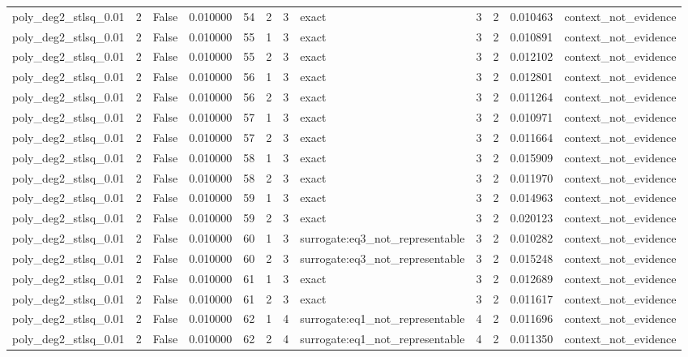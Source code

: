\begin{tabular}{lrrrrrrlrrrl}
poly\_deg2\_stlsq\_0.01 & 2 & False & 0.010000 & 54 & 2 & 3 & exact & 3 & 2 & 0.010463 & context\_not\_evidence \\
poly\_deg2\_stlsq\_0.01 & 2 & False & 0.010000 & 55 & 1 & 3 & exact & 3 & 2 & 0.010891 & context\_not\_evidence \\
poly\_deg2\_stlsq\_0.01 & 2 & False & 0.010000 & 55 & 2 & 3 & exact & 3 & 2 & 0.012102 & context\_not\_evidence \\
poly\_deg2\_stlsq\_0.01 & 2 & False & 0.010000 & 56 & 1 & 3 & exact & 3 & 2 & 0.012801 & context\_not\_evidence \\
poly\_deg2\_stlsq\_0.01 & 2 & False & 0.010000 & 56 & 2 & 3 & exact & 3 & 2 & 0.011264 & context\_not\_evidence \\
poly\_deg2\_stlsq\_0.01 & 2 & False & 0.010000 & 57 & 1 & 3 & exact & 3 & 2 & 0.010971 & context\_not\_evidence \\
poly\_deg2\_stlsq\_0.01 & 2 & False & 0.010000 & 57 & 2 & 3 & exact & 3 & 2 & 0.011664 & context\_not\_evidence \\
poly\_deg2\_stlsq\_0.01 & 2 & False & 0.010000 & 58 & 1 & 3 & exact & 3 & 2 & 0.015909 & context\_not\_evidence \\
poly\_deg2\_stlsq\_0.01 & 2 & False & 0.010000 & 58 & 2 & 3 & exact & 3 & 2 & 0.011970 & context\_not\_evidence \\
poly\_deg2\_stlsq\_0.01 & 2 & False & 0.010000 & 59 & 1 & 3 & exact & 3 & 2 & 0.014963 & context\_not\_evidence \\
poly\_deg2\_stlsq\_0.01 & 2 & False & 0.010000 & 59 & 2 & 3 & exact & 3 & 2 & 0.020123 & context\_not\_evidence \\
poly\_deg2\_stlsq\_0.01 & 2 & False & 0.010000 & 60 & 1 & 3 & surrogate:eq3\_not\_representable & 3 & 2 & 0.010282 & context\_not\_evidence \\
poly\_deg2\_stlsq\_0.01 & 2 & False & 0.010000 & 60 & 2 & 3 & surrogate:eq3\_not\_representable & 3 & 2 & 0.015248 & context\_not\_evidence \\
poly\_deg2\_stlsq\_0.01 & 2 & False & 0.010000 & 61 & 1 & 3 & exact & 3 & 2 & 0.012689 & context\_not\_evidence \\
poly\_deg2\_stlsq\_0.01 & 2 & False & 0.010000 & 61 & 2 & 3 & exact & 3 & 2 & 0.011617 & context\_not\_evidence \\
poly\_deg2\_stlsq\_0.01 & 2 & False & 0.010000 & 62 & 1 & 4 & surrogate:eq1\_not\_representable & 4 & 2 & 0.011696 & context\_not\_evidence \\
poly\_deg2\_stlsq\_0.01 & 2 & False & 0.010000 & 62 & 2 & 4 & surrogate:eq1\_not\_representable & 4 & 2 & 0.011350 & context\_not\_evidence \\

\end{tabular}
